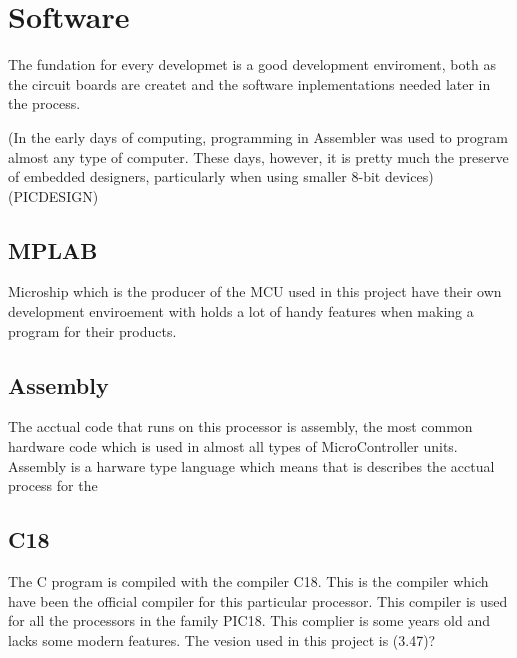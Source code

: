 \section{Software}
The fundation for every developmet is a good development enviroment, both as the circuit boards are createt and the software inplementations needed later in the process.

(In the early days of computing, programming in Assembler was used to program almost any type of
computer. These days, however, it is pretty much the preserve of embedded designers, particularly when
using smaller 8-bit devices) (PICDESIGN)

\subsection{MPLAB}
Microship which is the producer of the MCU used in this project have their own development enviroement with holds a lot of handy features when making a program for their products. 




\subsection{Assembly}
The acctual code that runs on this processor is assembly, the most common hardware code which is used in almost all types of MicroController units. Assembly is a harware type language which means that is describes the acctual process for the 

\subsection{C18}
The C program is compiled with the compiler C18. This is the compiler which have been the official compiler for this particular processor. This compiler is used for all the processors in the family PIC18. This complier is some years old and lacks some modern features. The vesion used in this project is (3.47)?